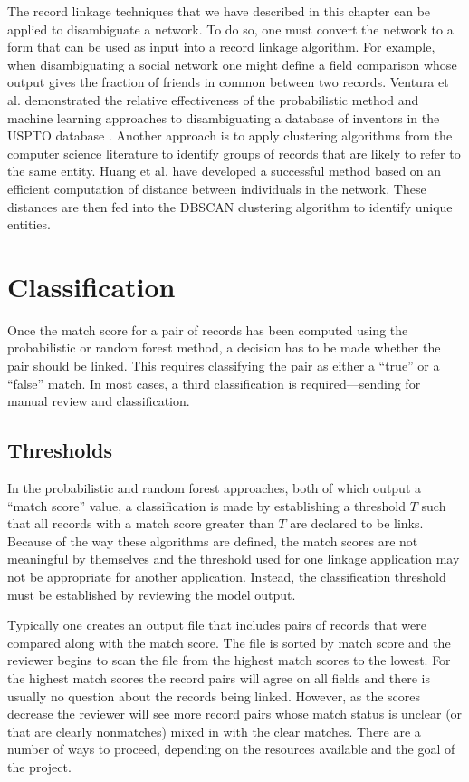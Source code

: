 \documentclass[]{krantz}
\begin{document}
The record linkage techniques that we have described in this chapter can
be applied to disambiguate a network. To do so, one must convert the
network to a form that can be used as input into a record linkage
algorithm. For example, when disambiguating a social network one might
define a field comparison whose output gives the fraction of friends in
common between two records. Ventura et al. demonstrated the relative
effectiveness of the probabilistic method and machine learning
approaches to disambiguating a database of inventors in the USPTO
database \citep{ventura2015seeing}. Another approach is to apply
clustering algorithms from the computer science literature to identify
groups of records that are likely to refer to the same entity. Huang et
al. \citeyearpar{HEG06} have developed a successful method based on an
efficient computation of distance between individuals in the network.
These distances are then fed into the DBSCAN clustering algorithm to
identify unique entities.

\section{Classification}\label{classification}

Once the match score for a pair of records has been computed using the
probabilistic or random forest method, a decision has to be made whether
the pair should be linked. This requires classifying the pair as either
a ``true'' or a ``false'' match. In most cases, a third classification
is required---sending for manual review and classification.

\subsection{Thresholds}\label{S:thresholds}

In the probabilistic and random forest approaches, both of which output
a ``match score'' value, a classification is made by establishing a
threshold \(T\) such that all records with a match score greater than
\(T\) are declared to be links. Because of the way these algorithms are
defined, the match scores are not meaningful by themselves and the
threshold used for one linkage application may not be appropriate for
another application. Instead, the classification threshold must be
established by reviewing the model output.

Typically one creates an output file that includes pairs of records that
were compared along with the match score. The file is sorted by match
score and the reviewer begins to scan the file from the highest match
scores to the lowest. For the highest match scores the record pairs will
agree on all fields and there is usually no question about the records
being linked. However, as the scores decrease the reviewer will see more
record pairs whose match status is unclear (or that are clearly
nonmatches) mixed in with the clear matches. There are a number of ways
to proceed, depending on the resources available and the goal of the
project.
\end{document}
